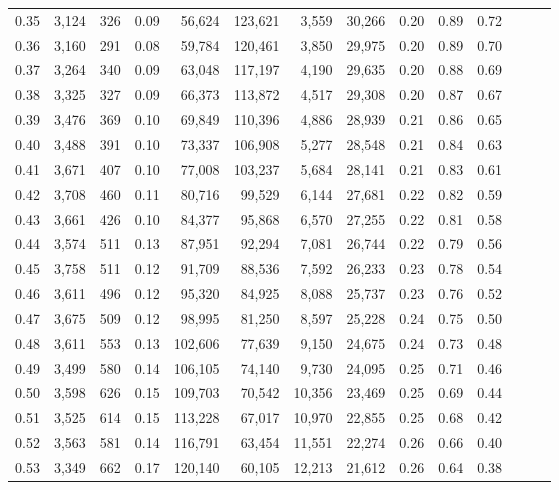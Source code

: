 \begin{tabular}{rrrrrrrrrrrrrr}
0.35 &  3,124 &  326 &  0.09 &   56,624 &  123,621 &   3,559 &  30,266 &  0.20 &  0.89 &      0.72 \\
0.36 &  3,160 &  291 &  0.08 &   59,784 &  120,461 &   3,850 &  29,975 &  0.20 &  0.89 &      0.70 \\
0.37 &  3,264 &  340 &  0.09 &   63,048 &  117,197 &   4,190 &  29,635 &  0.20 &  0.88 &      0.69 \\
0.38 &  3,325 &  327 &  0.09 &   66,373 &  113,872 &   4,517 &  29,308 &  0.20 &  0.87 &      0.67 \\
0.39 &  3,476 &  369 &  0.10 &   69,849 &  110,396 &   4,886 &  28,939 &  0.21 &  0.86 &      0.65 \\
0.40 &  3,488 &  391 &  0.10 &   73,337 &  106,908 &   5,277 &  28,548 &  0.21 &  0.84 &      0.63 \\
0.41 &  3,671 &  407 &  0.10 &   77,008 &  103,237 &   5,684 &  28,141 &  0.21 &  0.83 &      0.61 \\
0.42 &  3,708 &  460 &  0.11 &   80,716 &   99,529 &   6,144 &  27,681 &  0.22 &  0.82 &      0.59 \\
0.43 &  3,661 &  426 &  0.10 &   84,377 &   95,868 &   6,570 &  27,255 &  0.22 &  0.81 &      0.58 \\
0.44 &  3,574 &  511 &  0.13 &   87,951 &   92,294 &   7,081 &  26,744 &  0.22 &  0.79 &      0.56 \\
0.45 &  3,758 &  511 &  0.12 &   91,709 &   88,536 &   7,592 &  26,233 &  0.23 &  0.78 &      0.54 \\
0.46 &  3,611 &  496 &  0.12 &   95,320 &   84,925 &   8,088 &  25,737 &  0.23 &  0.76 &      0.52 \\
0.47 &  3,675 &  509 &  0.12 &   98,995 &   81,250 &   8,597 &  25,228 &  0.24 &  0.75 &      0.50 \\
0.48 &  3,611 &  553 &  0.13 &  102,606 &   77,639 &   9,150 &  24,675 &  0.24 &  0.73 &      0.48 \\
0.49 &  3,499 &  580 &  0.14 &  106,105 &   74,140 &   9,730 &  24,095 &  0.25 &  0.71 &      0.46 \\
0.50 &  3,598 &  626 &  0.15 &  109,703 &   70,542 &  10,356 &  23,469 &  0.25 &  0.69 &      0.44 \\
0.51 &  3,525 &  614 &  0.15 &  113,228 &   67,017 &  10,970 &  22,855 &  0.25 &  0.68 &      0.42 \\
0.52 &  3,563 &  581 &  0.14 &  116,791 &   63,454 &  11,551 &  22,274 &  0.26 &  0.66 &      0.40 \\
0.53 &  3,349 &  662 &  0.17 &  120,140 &   60,105 &  12,213 &  21,612 &  0.26 &  0.64 &      0.38 \\

\end{tabular}
